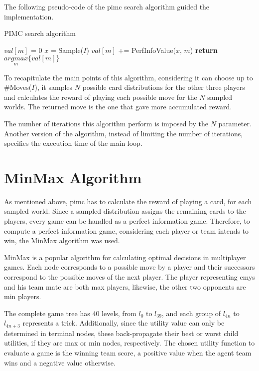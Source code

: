 The following pseudo-code of the \ac{pimc} search algorithm guided the implementation.

\begin{algorithm}
	\caption{PIMC search algorithm}
	\begin{algorithmic}[1]
				\State $val[m]$ = 0
			\EndFor
				\State $x$ = Sample($I$)
					\State $val[m]$ += PerfInfoValue($x$, $m$)
				\EndFor
			\EndFor
			\State \textbf{return} $\underset{m}{argmax}\{ val[m] \}$
		\EndProcedure
	\end{algorithmic}
\end{algorithm}

To recapitulate the main points of this algorithm, considering it can choose up to \#Moves($I$), it samples $N$ possible card distributions for the other three players and calculates the reward of playing each possible move for the $N$ sampled worlds.
The returned move is the one that gave more accumulated reward.

The number of iterations this algorithm perform is imposed by the $N$ parameter.
Another version of the algorithm, instead of limiting the number of iterations, specifies the execution time of the main loop.

\section*{MinMax Algorithm}

As mentioned above, \ac{pimc} has to calculate the reward of playing a card, for each sampled world.
Since a sampled distribution assigns the remaining cards to the players, every game can be handled as a perfect information game.
Therefore, to compute a perfect information game, considering each player or team intends to win, the MinMax algorithm was used.

MinMax is a popular algorithm for calculating optimal decisions in multiplayer games.
Each node corresponds to a possible move by a player and their successors correspond to the possible moves of the next player.
The player representing \ac{emys} and his team mate are both max players, likewise, the other two opponents are min players.

The complete game tree has 40 levels, from $l_{0}$ to $l_{39}$, and each group of $l_{4n}$ to $l_{4n+3}$ represents a trick.
Additionally, since the utility value can only be determined in terminal nodes, these back-propagate their best or worst child utilities, if they are max or min nodes, respectively.
The chosen utility function to evaluate a game is the winning team score, a positive value when the agent team wins and a negative value otherwise.




